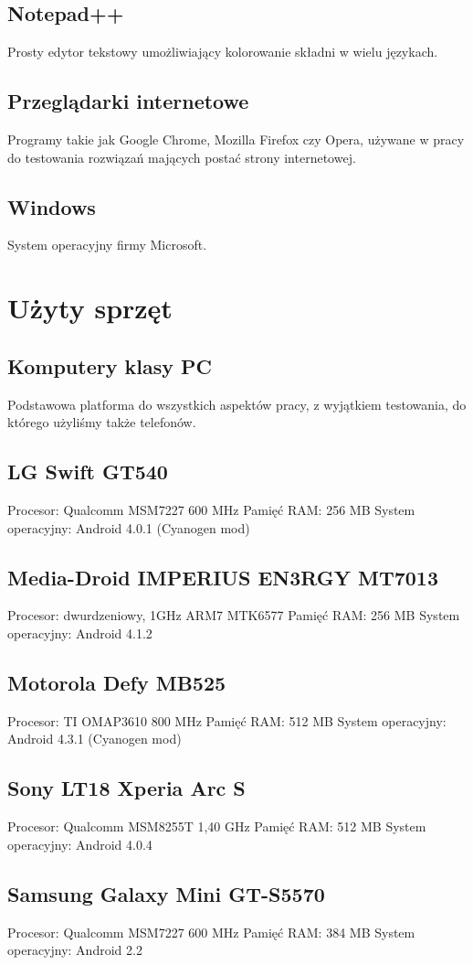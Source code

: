 \documentclass[11pt,a4paper,polish,thesis]{dcsbook}
\begin{document}
\subsection{Notepad++}
Prosty edytor tekstowy umożliwiający kolorowanie składni w wielu językach.
\subsection{Przeglądarki internetowe}
Programy takie jak Google Chrome, Mozilla Firefox czy Opera, używane w pracy do testowania rozwiązań mających postać strony internetowej.
\subsection{Windows}
System operacyjny firmy Microsoft.
\section{Użyty sprzęt}
\subsection{Komputery klasy PC}
Podstawowa platforma do wszystkich aspektów pracy, z wyjątkiem testowania, do którego użyliśmy także telefonów.
\subsection{LG Swift GT540}
Procesor: Qualcomm MSM7227 600 MHz
Pamięć RAM: 256 MB
System operacyjny: Android 4.0.1 (Cyanogen mod)
\subsection{Media-Droid IMPERIUS EN3RGY MT7013}
Procesor: dwurdzeniowy, 1GHz ARM7 MTK6577
Pamięć RAM: 256 MB
System operacyjny: Android 4.1.2
\subsection{Motorola Defy MB525}
Procesor: TI OMAP3610 800 MHz
Pamięć RAM: 512 MB
System operacyjny: Android 4.3.1 (Cyanogen mod)
\subsection{Sony LT18 Xperia Arc S}
Procesor: Qualcomm MSM8255T 1,40 GHz
Pamięć RAM: 512 MB
System operacyjny: Android 4.0.4
\subsection{Samsung Galaxy Mini GT-S5570}
Procesor: Qualcomm MSM7227 600 MHz
Pamięć RAM: 384 MB
System operacyjny: Android 2.2
\end{document}
